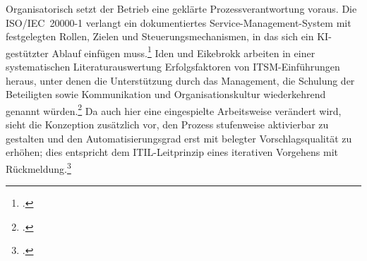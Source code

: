 Organisatorisch setzt der Betrieb eine gekl\"arte Prozessverantwortung voraus. Die ISO/IEC~20000-1 verlangt ein dokumentiertes Service-Management-System mit festgelegten Rollen, Zielen und Steuerungsmechanismen, in das sich ein KI-gest\"utzter Ablauf einf\"ugen muss.\footcite[Vgl.][Abschn.~4.4, 5.3, 6.2 und 9.1]{ISO20000} Iden und Eikebrokk arbeiten in einer systematischen Literaturauswertung Erfolgsfaktoren von ITSM-Einf\"uhrungen heraus, unter denen die Unterst\"utzung durch das Management, die Schulung der Beteiligten sowie Kommunikation und Organisationskultur wiederkehrend genannt w\"urden.\footcite[Vgl.][hier S.~518]{IdenEikebrokk2013} Da auch hier eine eingespielte Arbeitsweise ver\"andert wird, sieht die Konzeption zus\"atzlich vor, den Prozess stufenweise aktivierbar zu gestalten und den Automatisierungsgrad erst mit belegter Vorschlagsqualit\"at zu erh\"ohen; dies entspricht dem ITIL-Leitprinzip eines iterativen Vorgehens mit R\"uckmeldung.\footcite[Vgl.][S.~30]{Agutter2020}

